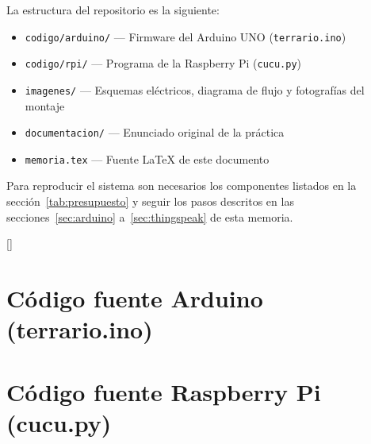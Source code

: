 \documentclass[12pt, a4paper]{article}
\begin{document}
La estructura del repositorio es la siguiente:

\begin{itemize}[noitemsep]
    \item \texttt{codigo/arduino/} --- Firmware del Arduino UNO (\texttt{terrario.ino})
    \item \texttt{codigo/rpi/} --- Programa de la Raspberry Pi (\texttt{cucu.py})
    \item \texttt{imagenes/} --- Esquemas eléctricos, diagrama de flujo y fotografías
          del montaje
    \item \texttt{documentacion/} --- Enunciado original de la práctica
    \item \texttt{memoria.tex} --- Fuente \LaTeX{} de este documento
\end{itemize}

Para reproducir el sistema son necesarios los componentes listados en la
sección~\ref{tab:presupuesto} y seguir los pasos descritos en las
secciones~\ref{sec:arduino} a~\ref{sec:thingspeak} de esta memoria.

\newpage

\appendix
{}[\titlerule]

\section{Código fuente Arduino (terrario.ino)}
\label{anx:arduino}



\newpage

\section{Código fuente Raspberry Pi (cucu.py)}
\label{anx:python}


\end{document}
